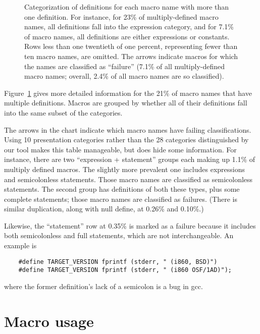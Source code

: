 \documentclass[10pt]{article}
\newcommand{\pkg}[1]{\textsf{#1}}
\newcommand{\captionsmall}[1]{\caption[]{\small #1}}
\begin{document}
\begin{figure}
  {\small\centerline{}}
  
  \captionsmall{Categorization of definitions for each macro name with more
    than one definition.  For instance, for 23\% of multiply-defined macro
    names, all definitions fall into the expression category, and for 7.1\%
    of macro names, all definitions are either expressions or constants.
    Rows less than one twentieth of one percent, representing fewer than
    ten macro names, are omitted.  The arrows indicate macros for which the
    names are classified as ``failure'' (7.1\% of all multiply-defined
    macro names; overall, 2.4\% of all macro names are so classified).}

  \label{fig:subset-categories}
\end{figure}

Figure~\ref{fig:subset-categories} gives more detailed information for the
21\% of macro names that have multiple definitions.  Macros are grouped by
whether all of their definitions fall into the same subset of the
categories.

The arrows in the chart indicate which macro names have failing
classifications.  Using 10 presentation categories rather than the 28
categories distinguished by our tool makes this table manageable, but does
hide some information.  For instance, there are two ``expression +
statement'' groups each making up 1.1\% of multiply defined macros.  The
slightly more prevalent one includes expressions and semicolonless
statements.  Those macro names are classified as semicolonless statements.
The second group has definitions of both these types, plus some complete
statements; those macro names are classified as failures.  (There is
similar duplication, along with null define, at 0.26\% and 0.10\%.)

Likewise, the ``statement'' row at 0.35\% is marked as a failure because it includes
both semicolonless and full statements, which are not interchangeable.  An
example is
\begin{verbatim}
    #define TARGET_VERSION fprintf (stderr, " (i860, BSD)")
    #define TARGET_VERSION fprintf (stderr, " (i860 OSF/1AD)");
\end{verbatim}
where the former definition's lack of a semicolon is a bug in \pkg{gcc}.



\section{Macro usage}
\end{document}
